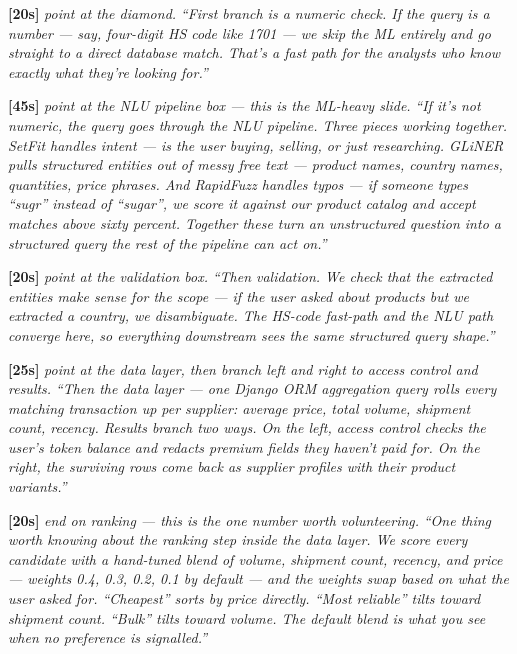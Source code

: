 \documentclass[11pt,a4paper]{article}
\newcommand{\beat}[1]{\textcolor{accent}{\textbf{[#1]}}}
\newcommand{\stage}[1]{{\itshape\color{stageborder}#1}}
\begin{document}
\vspace{0.4em}

\beat{20s} \stage{point at the diamond.}
\textit{``First branch is a numeric check. If the query is a number --- say, four-digit HS code like 1701 --- we skip the ML entirely and go straight to a direct database match. That's a fast path for the analysts who know exactly what they're looking for.''}

\vspace{0.4em}

\beat{45s} \stage{point at the NLU pipeline box --- this is the ML-heavy slide.}
\textit{``If it's not numeric, the query goes through the NLU pipeline. Three pieces working together. SetFit handles intent --- is the user buying, selling, or just researching. GLiNER pulls structured entities out of messy free text --- product names, country names, quantities, price phrases. And RapidFuzz handles typos --- if someone types ``sugr'' instead of ``sugar'', we score it against our product catalog and accept matches above sixty percent. Together these turn an unstructured question into a structured query the rest of the pipeline can act on.''}

\vspace{0.4em}

\beat{20s} \stage{point at the validation box.}
\textit{``Then validation. We check that the extracted entities make sense for the scope --- if the user asked about products but we extracted a country, we disambiguate. The HS-code fast-path and the NLU path converge here, so everything downstream sees the same structured query shape.''}

\vspace{0.4em}

\beat{25s} \stage{point at the data layer, then branch left and right to access control and results.}
\textit{``Then the data layer --- one Django ORM aggregation query rolls every matching transaction up per supplier: average price, total volume, shipment count, recency. Results branch two ways. On the left, access control checks the user's token balance and redacts premium fields they haven't paid for. On the right, the surviving rows come back as supplier profiles with their product variants.''}

\vspace{0.4em}

\beat{20s} \stage{end on ranking --- this is the one number worth volunteering.}
\textit{``One thing worth knowing about the ranking step inside the data layer. We score every candidate with a hand-tuned blend of volume, shipment count, recency, and price --- weights 0.4, 0.3, 0.2, 0.1 by default --- and the weights swap based on what the user asked for. ``Cheapest'' sorts by price directly. ``Most reliable'' tilts toward shipment count. ``Bulk'' tilts toward volume. The default blend is what you see when no preference is signalled.''}
\end{document}
